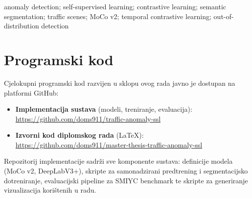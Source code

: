 \documentclass[diplomskirad]{fer}
\begin{document}
\begin{keywords}
	anomaly detection; self-supervised learning; contrastive learning; semantic segmentation; traffic scenes; MoCo v2; temporal contrastive learning; out-of-distribution detection
\end{keywords}



\backmatter

\chapter{Programski kod}

Cjelokupni programski kod razvijen u sklopu ovog rada javno je dostupan na platformi GitHub:

\begin{itemize}
	\item \textbf{Implementacija sustava} (modeli, treniranje, evaluacija): \\
	\url{https://github.com/doms911/traffic-anomaly-ssl}
	
	\item \textbf{Izvorni kod diplomskog rada} (LaTeX): \\
	\url{https://github.com/doms911/master-thesis-traffic-anomaly-ssl}
\end{itemize}

Repozitorij implementacije sadrži sve komponente sustava: definicije modela (MoCo v2, DeepLabV3+), skripte za samonadzirani predtrening i segmentacijsko dotreniranje, evaluacijski pipeline za SMIYC benchmark te skripte za generiranje vizualizacija korištenih u radu.
\end{document}
